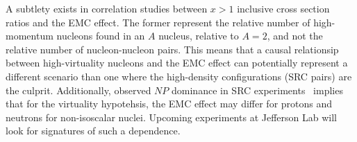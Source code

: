 A subtlety exists in correlation studies between $x>1$ inclusive cross section ratios and the EMC effect.  The former represent the relative number of high-momentum nucleons found in an $A$ nucleus, relative to $A=2$, and not the relative number of nucleon-nucleon pairs.  This means that a causal relationsip between high-virtuality nucleons and the EMC effect can potentially represent a different scenario than one where the high-density configurations (SRC pairs) are the culprit.  Additionally, observed $NP$ dominance in SRC experiments~\cite{Subedi:2008zz} implies that for the virtuality hypotehsis, the EMC effect may differ for protons and neutrons for non-isoscalar nuclei.  Upcoming experiments at Jefferson Lab will look for signatures of such a dependence. 
